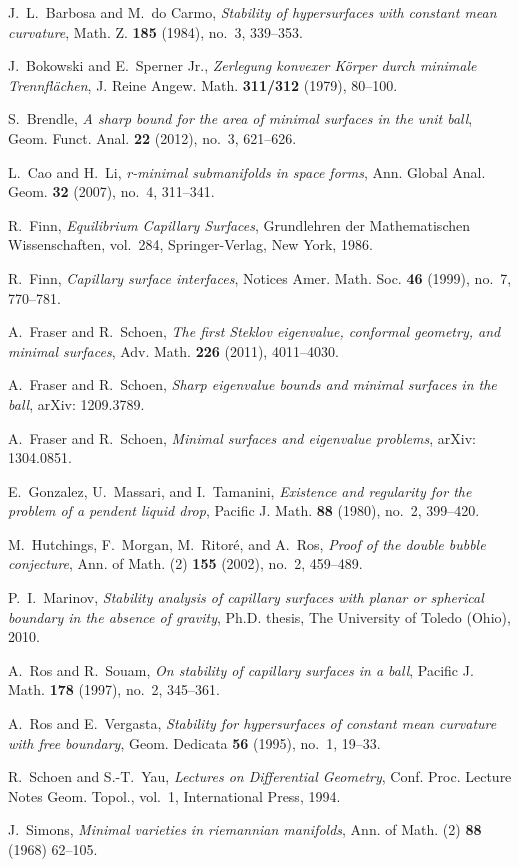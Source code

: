 \documentclass[11pt,reqno]{amsart}
\theoremstyle{definition}
\begin{document}


\begin{thebibliography}{10}

 J.~L.~Barbosa and M.~do Carmo, \emph{Stability of hypersurfaces with constant mean curvature}, Math. Z. \textbf{185} (1984), no.~3, 339--353.

 J.~Bokowski and E.~Sperner Jr., \emph{Zerlegung konvexer K\"{o}rper durch minimale Trennfl\"{a}chen}, J. Reine Angew. Math. \textbf{311/312} (1979), 80--100.

 S.~Brendle, \emph{A sharp bound for the area of minimal surfaces in the unit ball}, Geom. Funct. Anal. \textbf{22} (2012), no.~3, 621--626.

 L.~Cao and H.~Li, \emph{r-minimal submanifolds in space forms}, Ann. Global Anal. Geom. \textbf{32} (2007), no.~4, 311--341.

 R.~Finn, \emph{Equilibrium Capillary Surfaces}, Grundlehren der Mathematischen Wissenschaften, vol.~284, Springer-Verlag, New York, 1986.

 R.~Finn, \emph{Capillary surface interfaces}, Notices Amer. Math. Soc. \textbf{46} (1999), no.~7, 770--781.

 A.~Fraser and R.~Schoen, {\it The first Steklov eigenvalue, conformal geometry, and minimal surfaces}, Adv. Math. \textbf{226} (2011), 4011--4030.

 A.~Fraser and R.~Schoen, {\it Sharp eigenvalue bounds and minimal surfaces in the ball}, arXiv: 1209.3789.

 A.~Fraser and R.~Schoen, {\it Minimal surfaces and eigenvalue problems}, arXiv: 1304.0851.

 E.~Gonzalez, U.~Massari, and I.~Tamanini, \emph{Existence and regularity for the problem of a pendent liquid drop}, Pacific J. Math. \textbf{88} (1980), no.~2, 399--420.

 M.~Hutchings, F.~Morgan, M.~Ritor\'{e}, and A.~Ros, \emph{Proof of the double bubble conjecture}, Ann. of Math. (2) \textbf{155} (2002), no.~2, 459--489.

 P.~I.~Marinov, \emph{Stability analysis of capillary surfaces with planar or spherical boundary in the absence of gravity}, Ph.D. thesis, The University of Toledo (Ohio), 2010.

 A.~Ros and R.~Souam, \emph{On stability of capillary surfaces in a ball}, Pacific J. Math. \textbf{178} (1997), no.~2, 345--361.

 A.~Ros and E.~Vergasta, \emph{Stability for hypersurfaces of constant mean curvature with free boundary}, Geom. Dedicata \textbf{56} (1995), no.~1, 19--33.

 R.~Schoen and S.-T.~Yau, \emph{Lectures on Differential Geometry}, Conf. Proc. Lecture Notes Geom. Topol., vol.~1, International Press, 1994.

 J.~Simons, \emph{Minimal varieties in riemannian manifolds}, Ann. of Math. (2) \textbf{88} (1968) 62--105.

\end{thebibliography}
\end{document}
